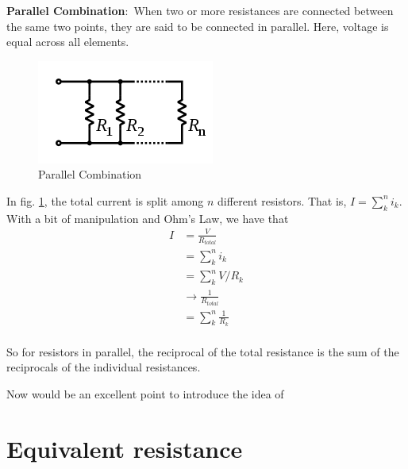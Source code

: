 \documentclass[nobib]{tufte-handout}
\newcommand{\defn}[2]{\noindent\textbf{#1}:\ #2}
\begin{document}
\defn{Parallel Combination}{When two or more resistances are 
connected between the same two points, they are said to be 
connected in parallel. Here, voltage is equal
across all elements}. 
\begin{figure}
    \center
    \includegraphics[width=\textwidth/2]{images/220px-Resistors_in_parallel.svg.png}
    \caption{Parallel Combination}
    \label{fig:parallel}
\end{figure}
In fig. \ref{fig:parallel}, the total current is split among
$n$ different resistors. That is, $I = \sum_k^n i_k$. With a bit of
manipulation and Ohm's Law, we have that
\begin{align*}
    I &= \frac{V}{R_{total}}\\
    &= \sum_k^n i_k \\
    &= \sum_k^n V/R_k \\
    &\rightarrow \frac{1}{R_{total}} \\
    &= \sum_k^n \frac{1}{R_k} \\
\end{align*}

So for resistors in parallel, the reciprocal of the total resistance is 
the sum of the reciprocals of the individual resistances. 

Now would
be an excellent point to introduce the idea of 

\pagebreak 

\section{Equivalent resistance}
\end{document}

